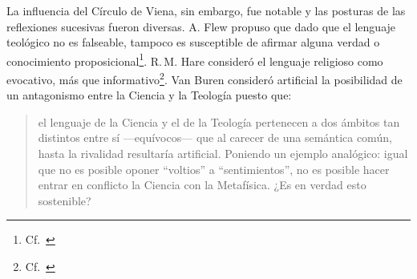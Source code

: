 
La influencia del Círculo de Viena, sin embargo, fue notable y las posturas de las reflexiones sucesivas fueron diversas. A. Flew propuso que dado que el lenguaje teológico no es falseable, tampoco es susceptible de afirmar alguna verdad o conocimiento proposicional\footnote{Cf.~\cite[27-30]{conesa1994cc}}. R.\,M. Hare consideró el lenguaje religioso como evocativo, más que informativo\footnote{Cf.~\cite[35-36]{conesa1994cc}}. Van Buren consideró artificial la posibilidad de un antagonismo entre la Ciencia y la Teología puesto que: \blockquote[{\cite[156]{dominguez2009at}}]{el lenguaje de la Ciencia y el de la Teología pertenecen a dos ámbitos tan distintos entre sí ---equívocos--- que al carecer de una semántica común, hasta la rivalidad resultaría artificial. Poniendo un ejemplo analógico: igual que no es posible oponer ``voltios'' a ``sentimientos'', no es posible hacer entrar en conflicto la Ciencia con la Metafísica. ¿Es en verdad esto sostenible?}

